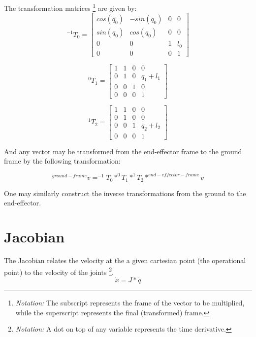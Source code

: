 \documentclass[12pt]{article}
\begin{document}
The transformation matrices
\footnote{{\em Notation:} The subscript represents the frame of the vector to be multiplied, 
while the superscript represents the final (transformed) frame.}
 are given by:
\begin{equation}
  ^{-1} T_{0} = 
  \begin{bmatrix} 
  cos(q_0) & -sin(q_0) & 0 & 0 \\ 
  sin(q_0) & cos(q_0) & 0 & 0 \\
  0 & 0 & 1 & l_{0} \\
  0 & 0 & 0 & 1 
  \end{bmatrix}
\end{equation}

\begin{equation}
  ^0 T_{1} = 
  \begin{bmatrix} 
  1 & 1 & 0 & 0 \\ 
  0 & 1 & 0 & q_1+l_{1} \\
  0 & 0 & 1 & 0 \\
  0 & 0 & 0 & 1 
  \end{bmatrix}
\end{equation}

\begin{equation}
  ^1 T_{2} = 
  \begin{bmatrix} 
  1 & 1 & 0 & 0 \\ 
  0 & 1 & 0 & 0 \\
  0 & 0 & 1 & q_2+l_{2} \\
  0 & 0 & 0 & 1 
  \end{bmatrix}
\end{equation}

And any vector may be transformed from the end-effector frame to the ground
frame by the following transformation:

\begin{equation}
  ^{ground-frame} v =  ^{-1} T_0 * ^0 T_1 * ^1 T_2 * ^{end-effector-frame} v
\end{equation}

One may similarly construct the inverse transformations from the ground to the end-effector.

\section{Jacobian}
The Jacobian relates the velocity at the a given cartesian point (the operational point)
 to the velocity of the joints
\footnote{{\em Notation:} A dot on top of any variable represents the time derivative.}.
\begin{equation}
  \dot x = J * \dot q
\end{equation}
\end{document}
